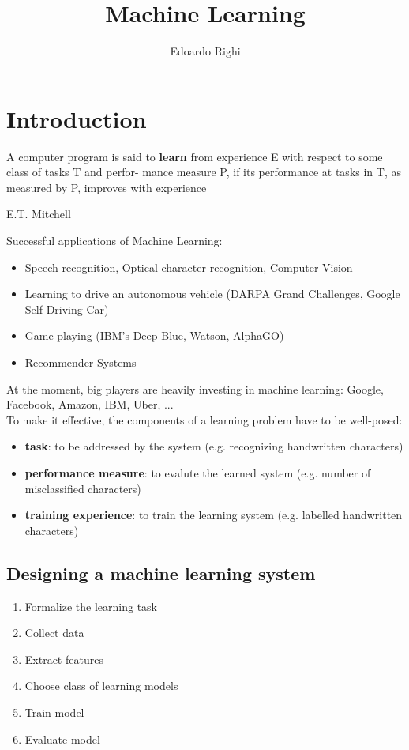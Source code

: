 \documentclass[a4paper, 10pt, titlepage]{article}
\begin{document}
	\title{Machine Learning}
	\author{Edoardo Righi}
	\maketitle
	
	\section{Introduction}
	\epigraph{A computer program is said to \textbf{learn} from experience E with respect to some class of tasks T and perfor-
mance measure P, if its performance at tasks in T, as measured by P, improves with experience}{E.T. Mitchell}

Successful applications of Machine Learning:
\begin{itemize}
\item Speech recognition, Optical character recognition, Computer Vision
\item Learning to drive an autonomous vehicle (DARPA Grand Challenges, Google Self-Driving Car)
\item Game playing (IBM’s Deep Blue, Watson, AlphaGO)
\item Recommender Systems
\end{itemize}
At the moment, big players are heavily investing in machine learning:
Google, Facebook, Amazon, IBM, Uber, ...\\
To make it effective, the components of a learning problem have to be well-posed:
\begin{itemize}
\item \textbf{task}: to be addressed by the system (e.g. recognizing handwritten characters)
\item \textbf{performance measure}: to evalute the learned system (e.g. number of misclassified characters)
\item \textbf{training experience}: to train the learning system (e.g. labelled handwritten characters)
\end{itemize}
\subsection{Designing a machine learning system}
\begin{enumerate}
\item Formalize the learning task
\item Collect data
\item Extract features
\item Choose class of learning models
\item Train model
\item Evaluate model
\end{enumerate}
\end{document}
